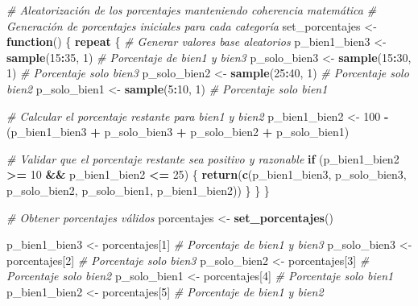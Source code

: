 \documentclass[
]{article}
\newenvironment{Shaded}{\begin{snugshade}}{\end{snugshade}}
\newcommand{\CommentTok}[1]{\textcolor[rgb]{0.56,0.35,0.01}{\textit{#1}}}
\newcommand{\ControlFlowTok}[1]{\textcolor[rgb]{0.13,0.29,0.53}{\textbf{#1}}}
\newcommand{\DecValTok}[1]{\textcolor[rgb]{0.00,0.00,0.81}{#1}}
\newcommand{\FunctionTok}[1]{\textcolor[rgb]{0.13,0.29,0.53}{\textbf{#1}}}
\newcommand{\NormalTok}[1]{#1}
\newcommand{\OtherTok}[1]{\textcolor[rgb]{0.56,0.35,0.01}{#1}}
\newcommand{\SpecialCharTok}[1]{\textcolor[rgb]{0.81,0.36,0.00}{\textbf{#1}}}
\begin{document}
\begin{Shaded}
\begin{Highlighting}[]
\CommentTok{\# Aleatorización de los porcentajes manteniendo coherencia matemática}
\CommentTok{\# Generación de porcentajes iniciales para cada categoría}
\NormalTok{set\_porcentajes }\OtherTok{\textless{}{-}} \ControlFlowTok{function}\NormalTok{() \{}
  \ControlFlowTok{repeat}\NormalTok{ \{}
    \CommentTok{\# Generar valores base aleatorios}
\NormalTok{    p\_bien1\_bien3 }\OtherTok{\textless{}{-}} \FunctionTok{sample}\NormalTok{(}\DecValTok{15}\SpecialCharTok{:}\DecValTok{35}\NormalTok{, }\DecValTok{1}\NormalTok{)  }\CommentTok{\# Porcentaje de bien1 y bien3}
\NormalTok{    p\_solo\_bien3 }\OtherTok{\textless{}{-}} \FunctionTok{sample}\NormalTok{(}\DecValTok{15}\SpecialCharTok{:}\DecValTok{30}\NormalTok{, }\DecValTok{1}\NormalTok{)   }\CommentTok{\# Porcentaje solo bien3}
\NormalTok{    p\_solo\_bien2 }\OtherTok{\textless{}{-}} \FunctionTok{sample}\NormalTok{(}\DecValTok{25}\SpecialCharTok{:}\DecValTok{40}\NormalTok{, }\DecValTok{1}\NormalTok{)   }\CommentTok{\# Porcentaje solo bien2}
\NormalTok{    p\_solo\_bien1 }\OtherTok{\textless{}{-}} \FunctionTok{sample}\NormalTok{(}\DecValTok{5}\SpecialCharTok{:}\DecValTok{10}\NormalTok{, }\DecValTok{1}\NormalTok{)    }\CommentTok{\# Porcentaje solo bien1}

    \CommentTok{\# Calcular el porcentaje restante para bien1 y bien2}
\NormalTok{    p\_bien1\_bien2 }\OtherTok{\textless{}{-}} \DecValTok{100} \SpecialCharTok{{-}}\NormalTok{ (p\_bien1\_bien3 }\SpecialCharTok{+}\NormalTok{ p\_solo\_bien3 }\SpecialCharTok{+}\NormalTok{ p\_solo\_bien2 }\SpecialCharTok{+}\NormalTok{ p\_solo\_bien1)}

    \CommentTok{\# Validar que el porcentaje restante sea positivo y razonable}
    \ControlFlowTok{if}\NormalTok{ (p\_bien1\_bien2 }\SpecialCharTok{\textgreater{}=} \DecValTok{10} \SpecialCharTok{\&\&}\NormalTok{ p\_bien1\_bien2 }\SpecialCharTok{\textless{}=} \DecValTok{25}\NormalTok{) \{}
      \FunctionTok{return}\NormalTok{(}\FunctionTok{c}\NormalTok{(p\_bien1\_bien3, p\_solo\_bien3, p\_solo\_bien2, p\_solo\_bien1, p\_bien1\_bien2))}
\NormalTok{    \}}
\NormalTok{  \}}
\NormalTok{\}}

\CommentTok{\# Obtener porcentajes válidos}
\NormalTok{porcentajes }\OtherTok{\textless{}{-}} \FunctionTok{set\_porcentajes}\NormalTok{()}

\NormalTok{p\_bien1\_bien3 }\OtherTok{\textless{}{-}}\NormalTok{ porcentajes[}\DecValTok{1}\NormalTok{]  }\CommentTok{\# Porcentaje de bien1 y bien3}
\NormalTok{p\_solo\_bien3 }\OtherTok{\textless{}{-}}\NormalTok{ porcentajes[}\DecValTok{2}\NormalTok{]   }\CommentTok{\# Porcentaje solo bien3}
\NormalTok{p\_solo\_bien2 }\OtherTok{\textless{}{-}}\NormalTok{ porcentajes[}\DecValTok{3}\NormalTok{]   }\CommentTok{\# Porcentaje solo bien2}
\NormalTok{p\_solo\_bien1 }\OtherTok{\textless{}{-}}\NormalTok{ porcentajes[}\DecValTok{4}\NormalTok{]   }\CommentTok{\# Porcentaje solo bien1}
\NormalTok{p\_bien1\_bien2 }\OtherTok{\textless{}{-}}\NormalTok{ porcentajes[}\DecValTok{5}\NormalTok{]  }\CommentTok{\# Porcentaje de bien1 y bien2}


\end{Highlighting}
\end{Shaded}
\end{document}
